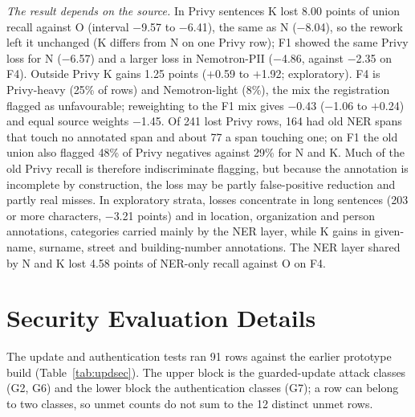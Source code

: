 \documentclass[sigconf]{acmart}
\theoremstyle{acmdefinition}\newtheorem{property}{Property}
\begin{document}
\textit{The result depends on the source.} In Privy sentences K lost 8.00 points of union recall against O (interval $-$9.57 to $-$6.41), the same as N ($-$8.04), so the rework left it unchanged (K differs from N on one Privy row); F1 showed the same Privy loss for N ($-$6.57) and a larger loss in Nemotron-PII ($-$4.86, against $-$2.35 on F4). Outside Privy K gains 1.25 points ($+$0.59 to $+$1.92; exploratory). F4 is Privy-heavy (25\% of rows) and Nemotron-light (8\%), the mix the registration flagged as unfavourable; reweighting to the F1 mix gives $-$0.43 ($-$1.06 to $+$0.24) and equal source weights $-$1.45. Of 241 lost Privy rows, 164 had old NER spans that touch no annotated span and about 77 a span touching one; on F1 the old union also flagged 48\% of Privy negatives against 29\% for N and K. Much of the old Privy recall is therefore indiscriminate flagging, but because the annotation is incomplete by construction, the loss may be partly false-positive reduction and partly real misses. In exploratory strata, losses concentrate in long sentences (203 or more characters, $-$3.21 points) and in location, organization and person annotations, categories carried mainly by the NER layer, while K gains in given-name, surname, street and building-number annotations. The NER layer shared by N and K lost 4.58 points of NER-only recall against O on F4.

\section{Security Evaluation Details}
\label{app:secdetail}
The update and authentication tests ran 91 rows against the earlier prototype build (Table~\ref{tab:updsec}). The upper block is the guarded-update attack classes (G2, G6) and the lower block the authentication classes (G7); a row can belong to two classes, so unmet counts do not sum to the 12 distinct unmet rows.
\end{document}
